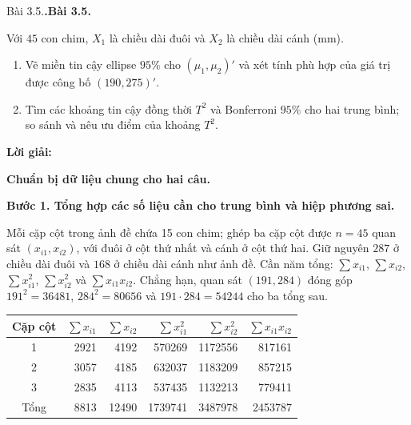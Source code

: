 \documentclass[11pt,a4paper]{article}
\makeatletter
\newcounter{prob}
\newenvironment{problem}[1][]{%
  \par\addvspace{14pt}\noindent\begin{minipage}{\linewidth}
  \def\@tempa{#1}%
  \ifx\@tempa\@empty\refstepcounter{prob}\textbf{\theprob.}\else\textbf{#1}\fi
  \ \ignorespaces
}{\par\end{minipage}\par\nopagebreak[4]}
\newenvironment{solution}{%
  \par\medskip\noindent\textbf{Lời giải:}\par\nobreak\smallskip\noindent\ignorespaces
}{\par}
\newcommand{\step}[2]{\par\medskip\noindent\textbf{Bước #1. #2}\par\nopagebreak[4]\smallskip\noindent}
\makeatother
\begin{document}
\begin{problem}[Bài 3.5.]
Với $45$ con chim, $X_1$ là chiều dài đuôi và $X_2$ là chiều dài cánh (mm).
\begin{enumerate}[label=(\alph*)]
\item Vẽ miền tin cậy ellipse $95\%$ cho $(\mu_1,\mu_2)'$ và xét tính phù hợp
của giá trị được công bố $(190,275)'$.
\item Tìm các khoảng tin cậy đồng thời $T^2$ và Bonferroni $95\%$ cho hai
trung bình; so sánh và nêu ưu điểm của khoảng $T^2$.
\end{enumerate}
\end{problem}
\begin{solution}
\textbf{Chuẩn bị dữ liệu chung cho hai câu.}
\step{1}{Tổng hợp các số liệu cần cho trung bình và hiệp phương sai.}
Mỗi cặp cột trong ảnh đề chứa 15 con chim; ghép ba cặp cột được $n=45$
quan sát $(x_{i1},x_{i2})$, với đuôi ở cột thứ nhất và cánh ở cột thứ hai.
Giữ nguyên $287$ ở chiều dài đuôi và $168$ ở chiều dài cánh như ảnh đề.
Cần năm tổng: $\sum x_{i1}$, $\sum x_{i2}$, $\sum x_{i1}^2$,
$\sum x_{i2}^2$ và $\sum x_{i1}x_{i2}$.
Chẳng hạn, quan sát $(191,284)$ đóng góp $191^2=36481$,
$284^2=80656$ và $191\cdot284=54244$ cho ba tổng sau.
\begin{center}
\small
\begin{tabular}{crrrrr}
\toprule
Cặp cột & $\sum x_{i1}$ & $\sum x_{i2}$ & $\sum x_{i1}^2$ & $\sum x_{i2}^2$ & $\sum x_{i1}x_{i2}$\\
\midrule
1 & 2921 & 4192 & 570269 & 1172556 & 817161\\
2 & 3057 & 4185 & 632037 & 1183209 & 857215\\
3 & 2835 & 4113 & 537435 & 1132213 & 779411\\
\midrule
Tổng & 8813 & 12490 & 1739741 & 3487978 & 2453787\\
\bottomrule
\end{tabular}
\end{center}


\end{solution}
\end{document}
